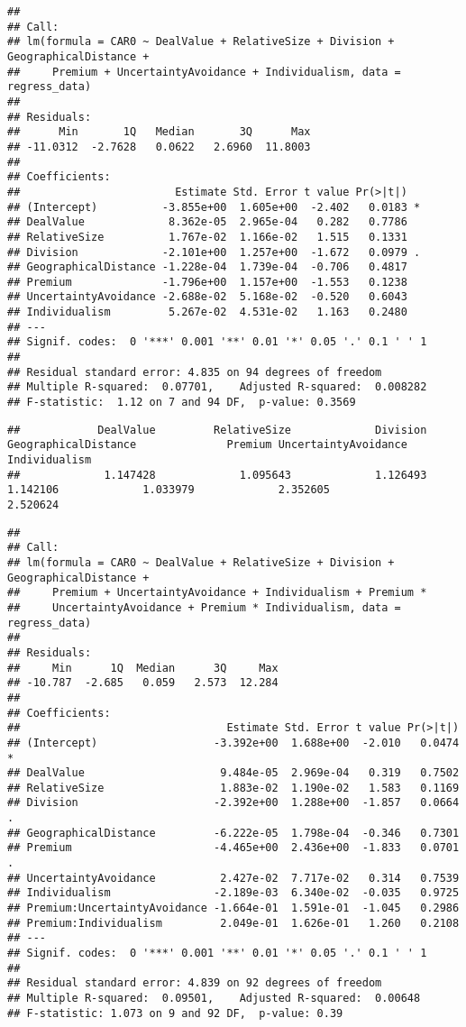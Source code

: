 \documentclass[]{article}
\begin{document}
\begin{verbatim}
## 
## Call:
## lm(formula = CAR0 ~ DealValue + RelativeSize + Division + GeographicalDistance + 
##     Premium + UncertaintyAvoidance + Individualism, data = regress_data)
## 
## Residuals:
##      Min       1Q   Median       3Q      Max 
## -11.0312  -2.7628   0.0622   2.6960  11.8003 
## 
## Coefficients:
##                        Estimate Std. Error t value Pr(>|t|)  
## (Intercept)          -3.855e+00  1.605e+00  -2.402   0.0183 *
## DealValue             8.362e-05  2.965e-04   0.282   0.7786  
## RelativeSize          1.767e-02  1.166e-02   1.515   0.1331  
## Division             -2.101e+00  1.257e+00  -1.672   0.0979 .
## GeographicalDistance -1.228e-04  1.739e-04  -0.706   0.4817  
## Premium              -1.796e+00  1.157e+00  -1.553   0.1238  
## UncertaintyAvoidance -2.688e-02  5.168e-02  -0.520   0.6043  
## Individualism         5.267e-02  4.531e-02   1.163   0.2480  
## ---
## Signif. codes:  0 '***' 0.001 '**' 0.01 '*' 0.05 '.' 0.1 ' ' 1
## 
## Residual standard error: 4.835 on 94 degrees of freedom
## Multiple R-squared:  0.07701,    Adjusted R-squared:  0.008282 
## F-statistic:  1.12 on 7 and 94 DF,  p-value: 0.3569
\end{verbatim}

\begin{verbatim}
##            DealValue         RelativeSize             Division GeographicalDistance              Premium UncertaintyAvoidance        Individualism 
##             1.147428             1.095643             1.126493             1.142106             1.033979             2.352605             2.520624
\end{verbatim}

\begin{verbatim}
## 
## Call:
## lm(formula = CAR0 ~ DealValue + RelativeSize + Division + GeographicalDistance + 
##     Premium + UncertaintyAvoidance + Individualism + Premium * 
##     UncertaintyAvoidance + Premium * Individualism, data = regress_data)
## 
## Residuals:
##     Min      1Q  Median      3Q     Max 
## -10.787  -2.685   0.059   2.573  12.284 
## 
## Coefficients:
##                                Estimate Std. Error t value Pr(>|t|)  
## (Intercept)                  -3.392e+00  1.688e+00  -2.010   0.0474 *
## DealValue                     9.484e-05  2.969e-04   0.319   0.7502  
## RelativeSize                  1.883e-02  1.190e-02   1.583   0.1169  
## Division                     -2.392e+00  1.288e+00  -1.857   0.0664 .
## GeographicalDistance         -6.222e-05  1.798e-04  -0.346   0.7301  
## Premium                      -4.465e+00  2.436e+00  -1.833   0.0701 .
## UncertaintyAvoidance          2.427e-02  7.717e-02   0.314   0.7539  
## Individualism                -2.189e-03  6.340e-02  -0.035   0.9725  
## Premium:UncertaintyAvoidance -1.664e-01  1.591e-01  -1.045   0.2986  
## Premium:Individualism         2.049e-01  1.626e-01   1.260   0.2108  
## ---
## Signif. codes:  0 '***' 0.001 '**' 0.01 '*' 0.05 '.' 0.1 ' ' 1
## 
## Residual standard error: 4.839 on 92 degrees of freedom
## Multiple R-squared:  0.09501,    Adjusted R-squared:  0.00648 
## F-statistic: 1.073 on 9 and 92 DF,  p-value: 0.39
\end{verbatim}
\end{document}
